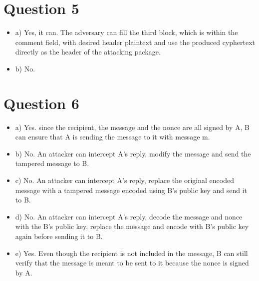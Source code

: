 \documentclass{article}
\begin{document}
\section{Question 5}
\begin{itemize}
    \item a) Yes, it can. The adversary can fill the third block, which is within the comment field, with desired header plaintext and use the produced cyphertext directly as the header of the attacking package.
    \item b) No. 
\end{itemize}
\newpage

\section{Question 6}
\begin{itemize}
    \item a) Yes. since the recipient, the message and the nonce are all signed by A, B can ensure that A is sending the message to it with message m.
    \item b) No. An attacker can intercept A's reply, modify the message and send the tampered message to B.
    \item c) No. An attacker can intercept A's reply, replace the original encoded message with a tampered message encoded using B's public key and send it to B.
    \item d) No. An attacker can intercept A's reply, decode the message and nonce with the B's public key, replace the message and encode with B's public key again before sending it to B.
    \item e) Yes. Even though the recipient is not included in the message, B can still verify that the message is meant to be sent to it because the nonce is signed by A.
\end{itemize}
\end{document}
